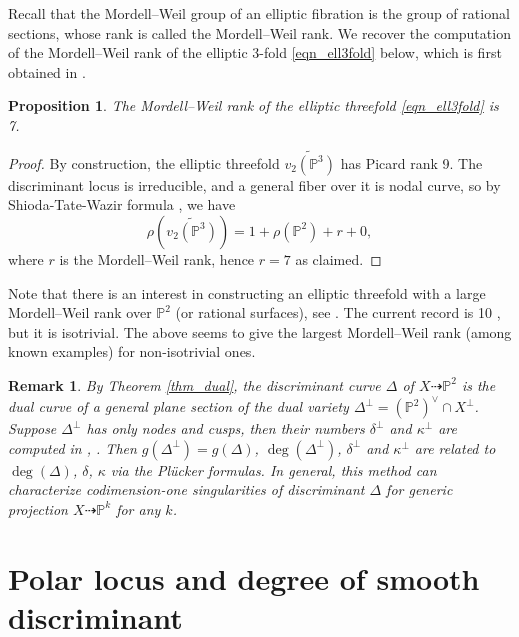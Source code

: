 \documentclass[12pt]{amsart}
\newtheorem{proposition}[theorem]{Proposition}
\newtheorem{remark}[theorem]{Remark}
\begin{document}
Recall that the Mordell--Weil group of an elliptic fibration is the group of rational sections, whose rank is called the Mordell--Weil rank. We recover the computation of the Mordell--Weil rank of the elliptic 3-fold \eqref{eqn_ell3fold} below, which is first obtained in \cite[Theorem 7.2]{Tot08}.
\begin{proposition}\cite{Tot08}
   The Mordell--Weil rank of the elliptic threefold \eqref{eqn_ell3fold} is  7. 
\end{proposition}
\begin{proof}
  By construction, the elliptic threefold $\widetilde{v_2(\mathbb P^3)}$ has Picard rank 9.
   The discriminant locus is irreducible, and a general fiber over it is nodal curve, so by Shioda-Tate-Wazir formula \cite{Wazir04}, we have
$$\rho(\widetilde{v_2(\mathbb P^3)})=1+\rho(\mathbb P^2)+r+0,$$
where $r$ is the Mordell--Weil rank, hence $r=7$ as claimed.
\end{proof}
Note that there is an interest in constructing an elliptic threefold with a large Mordell--Weil rank over $\mathbb P^2$ (or rational surfaces), see \cite{CogoLib14,HulekKloo11}. The current record is 10 \cite{GrassiWei22}, but it is isotrivial. The above seems to give the largest Mordell--Weil rank (among known examples) for non-isotrivial ones.

\begin{remark}\normalfont
  By Theorem \ref{thm_dual}, the discriminant curve $\Delta$ of $X\dashrightarrow \mathbb P^2$ is the dual curve of a general plane section of the dual variety $\Delta^{\perp}=(\mathbb P^2)^{\vee}\cap X^{\perp}$. Suppose $\Delta^{\perp}$ has only nodes and cusps, then their numbers $\delta^{\perp}$ and $\kappa^{\perp}$ are computed in \cite[(2.2), (2.3)]{DolLib81}, \cite{Roberts}. Then $g(\Delta^{\perp})=g(\Delta)$, $\deg(\Delta^{\perp})$, $\delta^{\perp}$ and $\kappa^{\perp}$ are related to $\deg(\Delta)$, $\delta$, $\kappa$ via the Pl\"ucker formulas. In general, this method can characterize codimension-one singularities of discriminant $\Delta$ for generic projection $X\dashrightarrow \mathbb P^k$ for any $k$.
\end{remark}




\section{Polar locus and degree of smooth discriminant}\label{sec_polar}
\end{document}
